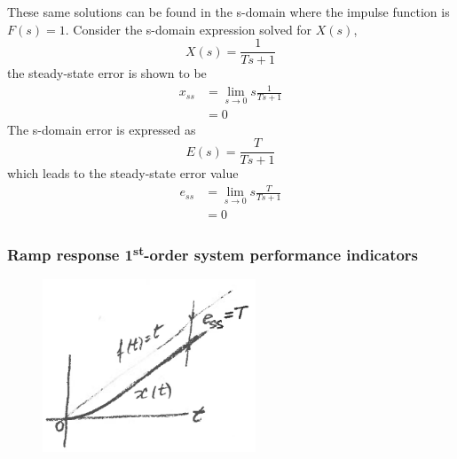 \documentclass[12pt,letter]{article}
\begin{document}
These same solutions can be found in the s-domain where the impulse function is $F(s)=1$. Consider the s-domain expression solved for $X(s)$, 
\begin{equation}
X(s) = \frac{1}{Ts +1} 
\end{equation}
the steady-state error is shown to be
\begin{align}
x_{ss} &= \lim\limits_{s \rightarrow 0} s \frac{1}{Ts+1}  \\
&= 0    \nonumber 
\end{align}
The s-domain error is expressed as
\begin{equation}
E(s) = \frac{T}{Ts +1} 
\end{equation}
which leads to the steady-state error value
\begin{align}
e_{ss} &= \lim\limits_{s \rightarrow 0}  s \frac{T}{Ts+1} \\
&= 0   \nonumber 
\end{align}







\subsubsection{Ramp response 1\textsuperscript{st}-order system performance indicators}

\begin{figure}[H]
	\centering
	\includegraphics[width=2.5in]{../figures/ramp_response_with_steady_state_error}
\end{figure}
\end{document}
